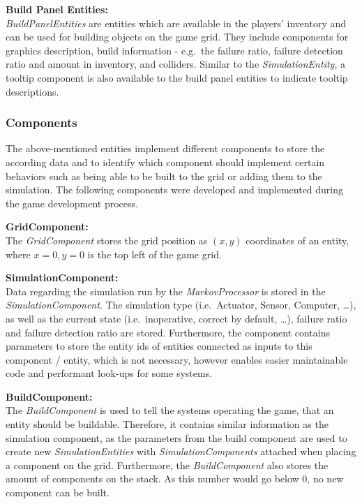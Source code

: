 \textbf{Build Panel Entities:} \\
\textit{BuildPanelEntities} are entities which are available in the players' inventory and can be used for building objects on the game grid.
They include components for graphics description, build information - e.g.\ the failure ratio, failure detection ratio and amount in inventory,
and colliders.
Similar to the \textit{SimulationEntity}, a tooltip component is also available to the build panel entities to indicate tooltip descriptions.
\subsubsection{Components}\label{subsubsec:components2}
The above-mentioned entities implement different components to store the according data and to identify which component
should implement certain behaviors such as being able to be built to the grid or adding them to the simulation.
The following components were developed and implemented during the game development process.

\textbf{GridComponent:} \\
The \textit{GridComponent} stores the grid position as $(x,y)$ coordinates of an entity, where $x=0, y=0$ is the top left of the game grid.

\textbf{SimulationComponent:} \\
Data regarding the simulation run by the \textit{MarkovProcessor} is stored in the \textit{SimulationComponent}.
The simulation type (i.e.\ Actuator, Sensor, Computer, \ldots), as well as the current state (i.e.\ inoperative, correct by default, \ldots), failure
ratio and failure detection ratio are stored.
Furthermore, the component contains parameters to store the entity ids of entities connected as inputs to this component / entity, which is
not necessary, however enables easier maintainable code and performant look-ups for some systems.

\textbf{BuildComponent:} \\
The \textit{BuildComponent} is used to tell the systems operating the game, that an entity should be buildable.
Therefore, it contains similar information as the simulation component, as the parameters from the build component are used
to create new \textit{SimulationEntities} with \textit{SimulationComponents} attached when placing a component on the grid.
Furthermore, the \textit{BuildComponent} also stores the amount of components on the stack.
As this number would go below 0, no new component can be built.

